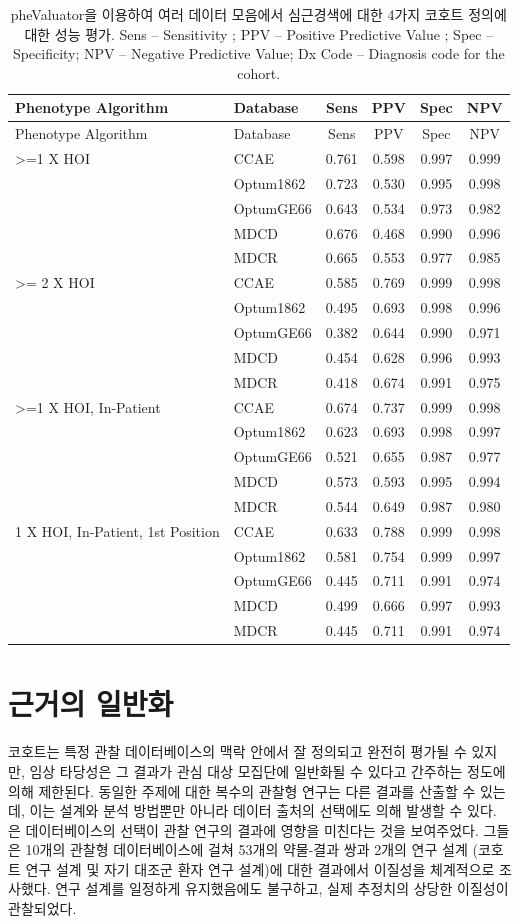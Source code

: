 \documentclass[10.5pt]{book}
\theoremstyle{definition}
\theoremstyle{definition}
\theoremstyle{definition}
\theoremstyle{remark}
\begin{document}
\begin{longtable}[]{@{}llcccc@{}}
\caption{\label{tab:phevalStats} pheValuator을 이용하여 여러 데이터 모음에서
심근경색에 대한 4가지 코호트 정의에 대한 성능 평가. Sens -- Sensitivity
; PPV -- Positive Predictive Value ; Spec -- Specificity; NPV --
Negative Predictive Value; Dx Code -- Diagnosis code for the
cohort.}\tabularnewline
\toprule
Phenotype Algorithm & Database & Sens & PPV & Spec & NPV\tabularnewline
\midrule
\endfirsthead
\toprule
Phenotype Algorithm & Database & Sens & PPV & Spec & NPV\tabularnewline
\midrule
\endhead
\textgreater{}=1 X HOI & CCAE & 0.761 & 0.598 & 0.997 &
0.999\tabularnewline
& Optum1862 & 0.723 & 0.530 & 0.995 & 0.998\tabularnewline
& OptumGE66 & 0.643 & 0.534 & 0.973 & 0.982\tabularnewline
& MDCD & 0.676 & 0.468 & 0.990 & 0.996\tabularnewline
& MDCR & 0.665 & 0.553 & 0.977 & 0.985\tabularnewline
\textgreater{}= 2 X HOI & CCAE & 0.585 & 0.769 & 0.999 &
0.998\tabularnewline
& Optum1862 & 0.495 & 0.693 & 0.998 & 0.996\tabularnewline
& OptumGE66 & 0.382 & 0.644 & 0.990 & 0.971\tabularnewline
& MDCD & 0.454 & 0.628 & 0.996 & 0.993\tabularnewline
& MDCR & 0.418 & 0.674 & 0.991 & 0.975\tabularnewline
\textgreater{}=1 X HOI, In-Patient & CCAE & 0.674 & 0.737 & 0.999 &
0.998\tabularnewline
& Optum1862 & 0.623 & 0.693 & 0.998 & 0.997\tabularnewline
& OptumGE66 & 0.521 & 0.655 & 0.987 & 0.977\tabularnewline
& MDCD & 0.573 & 0.593 & 0.995 & 0.994\tabularnewline
& MDCR & 0.544 & 0.649 & 0.987 & 0.980\tabularnewline
1 X HOI, In-Patient, 1st Position & CCAE & 0.633 & 0.788 & 0.999 &
0.998\tabularnewline
& Optum1862 & 0.581 & 0.754 & 0.999 & 0.997\tabularnewline
& OptumGE66 & 0.445 & 0.711 & 0.991 & 0.974\tabularnewline
& MDCD & 0.499 & 0.666 & 0.997 & 0.993\tabularnewline
& MDCR & 0.445 & 0.711 & 0.991 & 0.974\tabularnewline
\bottomrule
\end{longtable}

\section{근거의 일반화}\label{GeneralizabilityOfEvidence}

코호트는 특정 관찰 데이터베이스의 맥락 안에서 잘 정의되고 완전히 평가될
수 있지만, 임상 타당성은 그 결과가 관심 대상 모집단에 일반화될 수 있다고
간주하는 정도에 의해 제한된다. 동일한 주제에 대한 복수의 관찰형 연구는
다른 결과를 산출할 수 있는데, 이는 설계와 분석 방법뿐만 아니라 데이터
출처의 선택에도 의해 발생할 수 있다. \citet{madigan_2013} 은
데이터베이스의 선택이 관찰 연구의 결과에 영향을 미친다는 것을
보여주었다. 그들은 10개의 관찰형 데이터베이스에 걸쳐 53개의 약물-결과
쌍과 2개의 연구 설계 (코호트 연구 설계 및 자기 대조군 환자 연구 설계)에
대한 결과에서 이질성을 체계적으로 조사했다. 연구 설계를 일정하게
유지했음에도 불구하고, 실제 추정치의 상당한 이질성이 관찰되었다.
\end{document}
